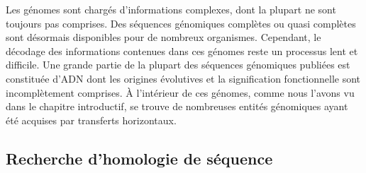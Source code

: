 Les génomes sont chargés d'informations complexes, dont la plupart ne sont toujours pas comprises. Des séquences génomiques complètes ou quasi complètes sont désormais disponibles pour de nombreux organismes. Cependant, le décodage des informations contenues dans ces génomes reste un processus lent et difficile. Une grande partie de la plupart des séquences génomiques publiées est constituée d'ADN dont les origines évolutives et la signification fonctionnelle sont incomplètement comprises. À l'intérieur de ces génomes, comme nous l'avons vu dans le chapitre introductif, se trouve de nombreuses entités génomiques ayant été acquises par transferts horizontaux.

\subsection{Recherche d'homologie de séquence}

